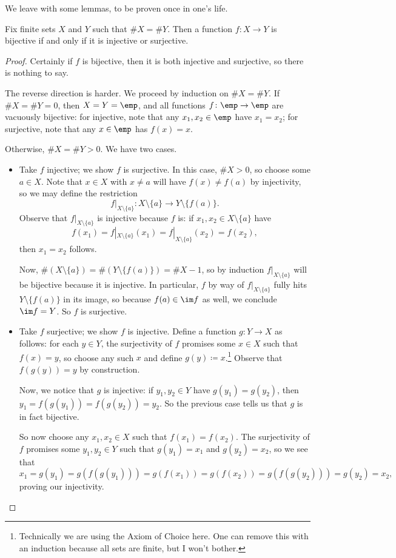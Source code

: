\documentclass[../notes.tex]{subfiles}
\begin{document}
We leave with some lemmas, to be proven once in one's life.
\begin{lemma}
	Fix finite sets $X$ and $Y$ such that $\#X=\#Y$. Then a function $f\colon X\to Y$ is bijective if and only if it is injective or surjective.
\end{lemma}
\begin{proof}
	Certainly if $f$ is bijective, then it is both injective and surjective, so there is nothing to say.
	
	The reverse direction is harder. We proceed by induction on $\#X=\#Y$. If $\#X=\#Y=0$, then $X=Y=\emp$, and all functions $f\colon\emp\to\emp$ are vacuously bijective: for injective, note that any $x_1,x_2\in\emp$ have $x_1=x_2$; for surjective, note that any $x\in\emp$ has $f(x)=x$.

	Otherwise, $\#X=\#Y>0$. We have two cases.
	\begin{itemize}
		\item Take $f$ injective; we show $f$ is surjective. In this case, $\#X>0$, so choose some $a\in X$. Note that $x\in X$ with $x\ne a$ will have $f(x)\ne f(a)$ by injectivity, so we may define the restriction
		\[f|_{X\setminus\{a\}}:X\setminus\{a\}\to Y\setminus\{f(a)\}.\]
		Observe that $f|_{X\setminus\{a\}}$ is injective because $f$ is: if $x_1,x_2\in X\setminus\{a\}$ have
		\[f(x_1)=f|_{X\setminus\{a\}}(x_1)=f|_{X\setminus\{a\}}(x_2)=f(x_2),\]
		then $x_1=x_2$ follows.
		
		Now, $\#(X\setminus\{a\})=\#(Y\setminus\{f(a)\})=\#X-1$, so by induction $f|_{X\setminus\{a\}}$ will be bijective because it is injective. In particular, $f$ by way of $f|_{X\setminus\{a\}}$ fully hits $Y\setminus\{f(a)\}$ in its image, so because $f(a)\in\im f$ as well, we conclude $\im f=Y$. So $f$ is surjective.

		\item Take $f$ surjective; we show $f$ is injective. Define a function $g\colon Y\to X$ as follows: for each $y\in Y$, the surjectivity of $f$ promises some $x\in X$ such that $f(x)=y$, so choose any such $x$ and define $g(y)\coloneqq x$.\footnote{Technically we are using the Axiom of Choice here. One can remove this with an induction because all sets are finite, but I won't bother.} Observe that $f(g(y))=y$ by construction.

		Now, we notice that $g$ is injective: if $y_1,y_2\in Y$ have $g(y_1)=g(y_2)$, then $y_1=f(g(y_1))=f(g(y_2))=y_2$. So the previous case tells us that $g$ is in fact bijective.

		So now choose any $x_1,x_2\in X$ such that $f(x_1)=f(x_2)$. The surjectivity of $f$ promises some $y_1,y_2\in Y$ such that $g(y_1)=x_1$ and $g(y_2)=x_2$, so we see that
		\[x_1=g(y_1)=g(f(g(y_1)))=g(f(x_1))=g(f(x_2))=g(f(g(y_2)))=g(y_2)=x_2,\]
		proving our injectivity.
		\qedhere
	\end{itemize}
\end{proof}
\end{document}
